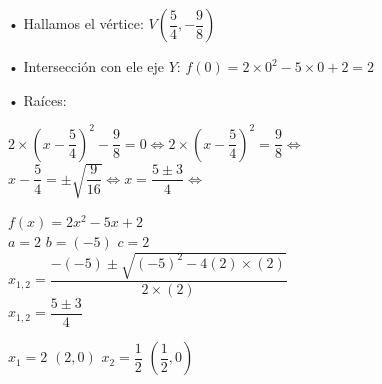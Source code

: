 • Hallamos el vértice: $V\left(\dfrac{5}{4},-\dfrac{9}{8} \right)$


• Intersección con ele eje $Y$: $f(0)= 2\times 0^2-5\times 0+2 = 2 $


• Raíces:
\\

\hfill
\begin{minipage}{.45\textwidth}
$2 \times \left( x -\dfrac{5}{4}\right)^2 -\dfrac{9}{8} =0 \Leftrightarrow 
2 \times \left( x -\dfrac{5}{4}\right)^2 = \dfrac{9}{8}  \Leftrightarrow $\\$
x -\dfrac{5}{4} =\pm \sqrt{\dfrac{9}{16}} \Leftrightarrow
x =  \dfrac{5\pm 3}{4} \Leftrightarrow $\\
\end{minipage}
\hfill
\begin{minipage}{.45\textwidth}
\begin{center}

$f(x) = 2x^2-5x+2$\\

$a=2$ \quad $b=(-5)$ \quad $c=2$\\

$x_{1,2}=\dfrac{-(-5)\pm\sqrt{(-5)^{2}-4(2)\times(2)}}{2\times(2)}$\\

$x_{1,2}=\dfrac{5 \pm 3}{4}$ \qquad $ $ \qquad  \qquad \qquad \qquad $ $
\end{center}
\end{minipage}
\hfill

\begin{center}

$x_1 =2$ \quad $(2, 0)$ \qquad \qquad
$x_2 =\dfrac{1}{2}$ \quad $\left( \dfrac{1}{2}, 0\right)$\\

\end{center}

